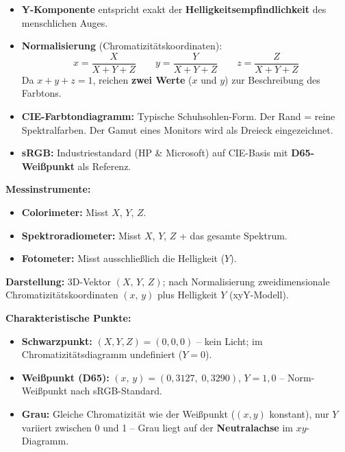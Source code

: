 \documentclass[12pt, a4paper]{article}
\begin{document}
\begin{itemize}
  \item \textbf{Y-Komponente} entspricht exakt der \textbf{Helligkeitsempfindlichkeit}
        des menschlichen Auges.
  \item \textbf{Normalisierung} (Chromatizitätskoordinaten):
        \[ x = \frac{X}{X+Y+Z} \qquad y = \frac{Y}{X+Y+Z} \qquad z = \frac{Z}{X+Y+Z} \]
        Da $x + y + z = 1$, reichen \textbf{zwei Werte} ($x$ und $y$) zur
        Beschreibung des Farbtons.
  \item \textbf{CIE-Farbtondiagramm:} Typische \glqq{}Schuhsohlen-Form\grqq{}.
        Der Rand = reine Spektralfarben. Der Gamut eines Monitors wird als Dreieck
        eingezeichnet.
  \item \textbf{sRGB:} Industriestandard (HP \& Microsoft) auf CIE-Basis mit
        \textbf{D65-Weißpunkt} als Referenz.
\end{itemize}

\textbf{Messinstrumente:}
\begin{itemize}
  \item \textbf{Colorimeter:} Misst $X$, $Y$, $Z$.
  \item \textbf{Spektroradiometer:} Misst $X$, $Y$, $Z$ + das gesamte Spektrum.
  \item \textbf{Fotometer:} Misst ausschließlich die Helligkeit ($Y$).
\end{itemize}

\textbf{Darstellung:} 3D-Vektor $(X,\,Y,\,Z)$; nach Normalisierung
zweidimensionale Chromatizitätskoordinaten $(x,\,y)$ plus Helligkeit $Y$
(xyY-Modell).

\textbf{Charakteristische Punkte:}
\begin{itemize}
  \item \textbf{Schwarzpunkt:} $(X,Y,Z) = (0,0,0)$ -- kein Licht;
        im Chromatizitätsdiagramm undefiniert ($Y = 0$).
  \item \textbf{Weißpunkt (D65):} $(x,\,y) = (0{,}3127,\;0{,}3290)$,
        $Y = 1{,}0$ -- Norm-Weißpunkt nach sRGB-Standard.
  \item \textbf{Grau:} Gleiche Chromatizität wie der Weißpunkt
        ($(x,y)$ konstant), nur $Y$ variiert zwischen 0 und 1 --
        Grau liegt auf der \textbf{Neutralachse} im $xy$-Diagramm.
\end{itemize}
\end{document}
